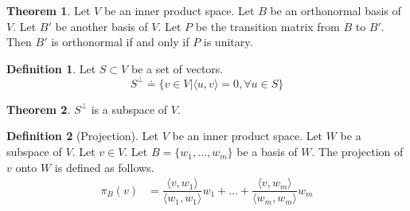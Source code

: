 \documentclass[fleqn, a5paper, 10pt]{amsart}
\theoremstyle{definition}
\newtheorem{definition}{Definition} %
\theoremstyle{theorem}
\newtheorem{theorem}{Theorem} %
\theoremstyle{remark}
\numberwithin{corollary}{theorem}
\numberwithin{equation}{theorem}
\begin{document}
\begin{theorem}
	Let $V$ be an inner product space. Let $B$ be an orthonormal basis of $V$. Let $B'$ be another basis of $V$. Let $P$ be the transition matrix from $B$ to $B'$. Then $B'$ is orthonormal if and only if $P$ is unitary.
\end{theorem}

\begin{definition}
	Let $S \subset V$ be a set of vectors. 
	\begin{equation*}
		S^{\perp} \doteq \{v \in V | \langle u, v \rangle = 0 , \forall u \in S\}
	\end{equation*}
\end{definition}

\begin{theorem}
	$S^{\perp}$ is a subspace of $V$.
\end{theorem}

\begin{definition}[Projection]
	Let $V$ be an inner product space. Let $W$ be a subspace of $V$. Let $v \in V$.	Let $B = \{w_1, \dots, w_m\}$ be a basis of $W$. The projection of $v$ onto $W$ is defined as follows.\\
	\begin{align*}
	\pi_B (v) &= \dfrac{\langle v, w_1 \rangle}{\langle w_1, w_1 \rangle} w_1 + \dots + \dfrac{\langle v, w_m \rangle}{\langle w_m, w_m \rangle} w_m
	\end{align*}
\end{definition}
\end{document}
